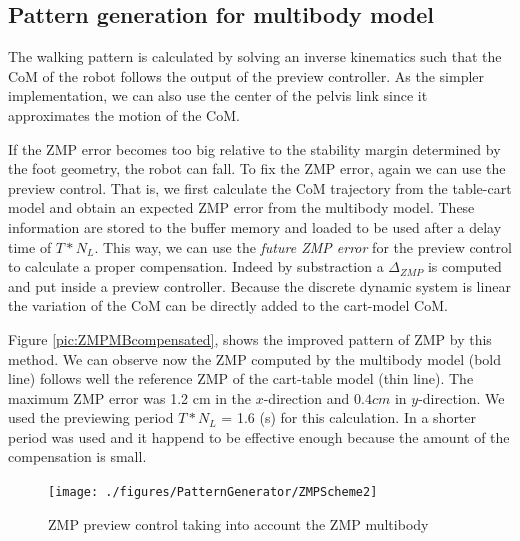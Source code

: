 \subsection{Pattern generation for multibody model}
The walking pattern is calculated by solving an inverse kinematics such that the CoM
of the robot follows the output of the preview controller. As the simpler implementation, we can
also use the center of the pelvis link since it approximates the motion of the CoM.
\par
If the ZMP error becomes too big relative to the stability margin determined by the foot geometry,
the robot can fall. To fix the ZMP error, again we can use the preview control. That
is, we first calculate the CoM trajectory from the table-cart model and
obtain an expected ZMP error from the multibody model.
These information are stored to the buffer memory and loaded to be used after a delay time
of $T*N_L$. This way, we can use the \textit{future ZMP error} for the preview control
to calculate a proper compensation.
Indeed by substraction a $\Delta_{ZMP}$ is computed and put inside a preview controller.
Because the discrete dynamic system is linear the variation of the CoM can be directly
added to the cart-model CoM.
\par
Figure \ref{pic:ZMPMBcompensated}, shows the improved pattern of ZMP by this method. We can observe now the ZMP
computed by the multibody model (bold line) follows well the reference ZMP of the cart-table
model (thin line). The maximum ZMP error was 1.2 cm in the $x$-direction and $0.4 cm$ in $y$-direction.
We used the previewing period  $T*N_L$ = 1.6 (s) for this calculation.
In \cite{Kajita2003} a shorter period was used and it happend to be effective enough
because the amount of the compensation is small.
%
\clearpage
\begin{figure}[h]
\begin{center}
\texttt{[image: ./figures/PatternGenerator/ZMPScheme2]}
\caption{ZMP preview control taking into account the ZMP multibody }
\label{pic:ZMPScheme2}
\end{center}
\end{figure}
\clearpage
%
\clearpage
